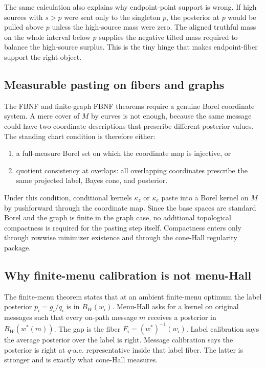 \documentclass[11pt]{article}
\theoremstyle{definition}
\theoremstyle{remark}
\begin{document}
The same calculation also explains why endpoint-point support is wrong. If high sources with $s>p$ were sent only to the singleton $p$, the posterior at $p$ would be pulled above $p$ unless the high-source mass were zero. The aligned truthful mass on the whole interval below $p$ supplies the negative tilted mass required to balance the high-source surplus. This is the tiny hinge that makes endpoint-fiber support the right object.

\subsection{Measurable pasting on fibers and graphs}

The FBNF and finite-graph FBNF theorems require a genuine Borel coordinate system. A mere cover of $M$ by curves is not enough, because the same message could have two coordinate descriptions that prescribe different posterior values. The standing chart condition is therefore either:
\begin{enumerate}[label=(\roman*), leftmargin=*]
  \item a full-measure Borel set on which the coordinate map is injective, or
  \item quotient consistency at overlaps: all overlapping coordinates prescribe the same projected label, Bayes cone, and posterior.
\end{enumerate}
Under this condition, conditional kernels $\kappa_z$ or $\kappa_e$ paste into a Borel kernel on $M$ by pushforward through the coordinate map. Since the base spaces are standard Borel and the graph is finite in the graph case, no additional topological compactness is required for the pasting step itself. Compactness enters only through rowwise minimizer existence and through the cone-Hall regularity package.

\subsection{Why finite-menu calibration is not menu-Hall}

The finite-menu theorem states that at an ambient finite-menu optimum the label posterior $p_i=g_i/q_i$ is in $B_W(w_i)$. Menu-Hall asks for a kernel on original messages such that every on-path message $m$ receives a posterior in $B_W(w^*(m))$. The gap is the fiber $F_i=(w^*)^{-1}(w_i)$. Label calibration says the average posterior over the label is right. Message calibration says the posterior is right at $q$-a.e. representative inside that label fiber. The latter is stronger and is exactly what cone-Hall measures.
\end{document}
